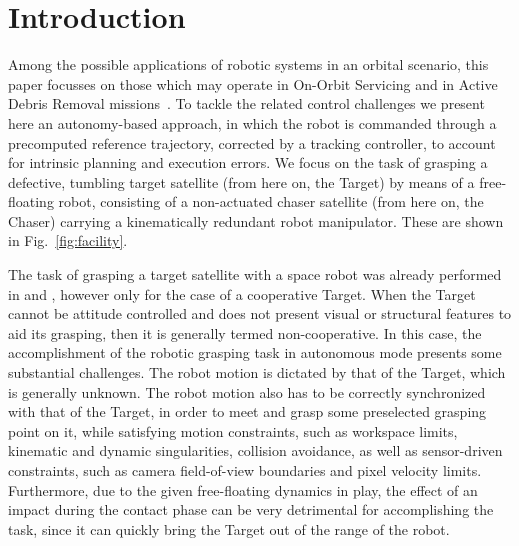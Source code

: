 \section{Introduction}
%
Among the possible applications of robotic systems in an orbital scenario, this paper focusses on those which may operate in On-Orbit Servicing and in Active Debris Removal missions~\cite{932685}\cite{doi: 10.1117/12.499871}\cite{dlr63555}\cite{telaar2017gnc}. To tackle the related control challenges we present here an autonomy-based approach, in which the robot is commanded through a precomputed reference trajectory, corrected by a tracking controller, to account for intrinsic planning and execution errors. We focus on the task of grasping a defective, tumbling target satellite (from here on, the Target) by means of a free-floating robot, consisting of a non-actuated chaser satellite (from here on, the Chaser) carrying a kinematically redundant robot manipulator. These are shown in Fig.~\ref{fig:facility}.

The task of grasping a target satellite with a space robot was already performed in \cite{932685} and \cite{doi: 10.1117/12.499871}, however only for the case of a cooperative Target. When the Target cannot be attitude controlled and does not present visual or structural features to aid its grasping, then it is generally termed non-cooperative. In this case, the accomplishment of the robotic grasping task in autonomous mode presents some substantial challenges. The robot motion is dictated by that of the Target, which is generally unknown. The robot motion also has to be correctly synchronized with that of the Target, in order to meet and grasp some preselected grasping point on it, while satisfying motion constraints, such as workspace limits, kinematic and dynamic singularities, collision avoidance, as well as sensor-driven constraints, such as camera field-of-view boundaries and pixel velocity limits. Furthermore, due to the given free-floating dynamics in play, the effect of an impact during the contact phase can be very detrimental for accomplishing the task, since it can quickly bring the Target out of the range of the robot.


